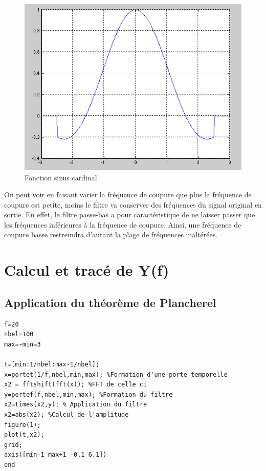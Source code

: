 \documentclass[a4paper, oneside]{report}
\begin{document}
\begin{figure}[h]
\centering
\includegraphics[scale=0.75]{images/sinc.png}
\caption{Fonction sinus cardinal}
\end{figure}

On peut voir en faisant varier la fr\'equence de coupure que plus la fr\'equence de coupure est petite, moins le filtre va conserver des fr\'equences du signal original en sortie.
En effet, le filtre passe-bas a pour caract\'eristique de ne laisser passer que les fr\'equences inf\'erieures \'a la fr\'equence de coupure. Ainsi, une fr\'equence de coupure basse restreindra d'autant la plage de fr\'equences inalt\'er\'ees.
  
 \chapter{Calcul et trac\'e de Y(f)}
 		
	\section{Application du th\'eor\`eme de Plancherel}

\begin{lstlisting}
f=20
nbel=100
max=-min=3

t=[min:1/nbel:max-1/nbel];
x=portet(1/f,nbel,min,max); %Formation d'une porte temporelle
x2 = fftshift(fft(x)); %FFT de celle ci
y=portef(f,nbel,min,max); %Formation du filtre
x2=times(x2,y); % Application du filtre 
x2=abs(x2); %Calcul de l'amplitude
figure(1);
plot(t,x2);
grid;
axis([min-1 max+1 -0.1 6.1])
end
\end{lstlisting}
\end{document}
